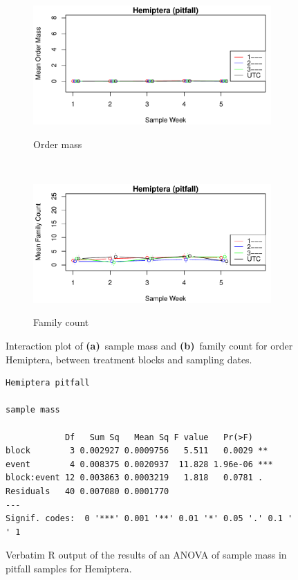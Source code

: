 \documentclass[10pt,letterpaper,twocolumn]{article}
\begin{document}
\begin{figure}[h]
	\centering
	\begin{subfigure}[b]{0.45\textwidth}
		\caption{Order mass}
		\includegraphics[width=\textwidth]{plots/blocks/interaction/mass/mass_pitfall_Hemiptera_interplot.pdf}
		\label{fig:pitfall_hemiptera_mass_interplot}
	\end{subfigure}
	~
	\begin{subfigure}[b]{0.45\textwidth}
		\caption{Family count}
		\includegraphics[width=\textwidth]{plots/blocks/interaction/family/family_pitfall_Hemiptera_interplot.pdf}
		\label{fig:pitfall_hemiptera_family_interplot}
	\end{subfigure}
	\caption{Interaction plot of \textbf{(a)}~sample mass and \textbf{(b)}~family count for order Hemiptera, between treatment blocks and sampling dates.}
	\label{fig:pitfall_hemiptera_interplot}
	\smallskip
	\nointerlineskip
	\hrulefill
\end{figure}

\begin{figure}[h]
	\lstset{numbers=left}
	\lstset{xleftmargin=5mm,framexleftmargin=5mm}
	\begin{lstlisting}
Hemiptera pitfall 

sample mass 

            Df   Sum Sq   Mean Sq F value   Pr(>F)    
block        3 0.002927 0.0009756   5.511   0.0029 ** 
event        4 0.008375 0.0020937  11.828 1.96e-06 ***
block:event 12 0.003863 0.0003219   1.818   0.0781 .  
Residuals   40 0.007080 0.0001770                     
---
Signif. codes:  0 '***' 0.001 '**' 0.01 '*' 0.05 '.' 0.1 ' ' 1
	\end{lstlisting}
	\caption{Verbatim R output of the results of an ANOVA of sample mass in pitfall samples for Hemiptera.}
	\label{fig:pitfall_hemiptera_mass_anova}
	\smallskip
	\nointerlineskip
	\hrulefill
\end{figure}
\end{document}
